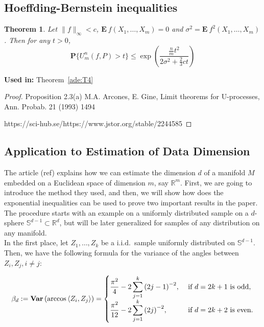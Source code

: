 \documentclass[12pt]{exam}
\def\R{\ensuremath{\mathbb{R}}}
\def\S{\ensuremath{\mathbb{S}}}
\def\E{\ensuremath{\mathbf{E}}\:}
\def\P{\ensuremath{\mathbf{P}}}
\def\Var{\ensuremath{\mathbf{Var}}\,}
\newtheorem{theorem}{Theorem}[section]
\theoremstyle{remark}
\newcommand{\angles}[1]{\ensuremath{\left\langle}#1\ensuremath{\right\rangle} }
\begin{document}
\subsection{Hoeffding-Bernstein inequalities}

\begin{theorem}\label{hb:T1}
  Let $\|f\|_\infty < c$, $\E f(X_1,\ldots, X_m) = 0$ and $\sigma^2 = \E f^2(X_1,\ldots, X_m)$. Then for any $t > 0$,
  \begin{equation}
    \P\{U_m^n(f,P) > t\} \leq \exp \left(\dfrac{\tfrac{n}{m}t^2}{2\sigma^2 + \tfrac{2}{3}ct}\right)
  \end{equation}
\end{theorem}

\textbf{Used in:} Theorem~\ref*{ade:T4}

\begin{proof}
  Proposition 2.3(a) M.A. Arcones, E. Gine, Limit theorems for U-processes, Ann. Probab. 21 (1993) 1494 
  
  https://sci-hub.se/https://www.jstor.org/stable/2244585
\end{proof}


\subsection{Application to Estimation of Data Dimension}
The article (ref) explains how we can estimate the dimension $d$ of a manifold $M$ embedded on a Euclidean space of dimension $m$, say $\R^m$. First, we are going to introduce the method they used, and then, we will show how does the exponential inequalities can be used to prove two important results in the paper. The procedure starts with an example on a uniformly distributed sample on a $d$-sphere $\S^{d-1} \subset \R^d$, but will be later generalized for samples of any distribution on any manifold.\\[4mm]

In the first place, let $Z_1, \ldots, Z_k$ be a i.i.d.\ sample uniformly distributed on $\S^{d-1}$. Then, we have the following formula for the variance of the angles between $Z_i,Z_j, i\neq j$:

\begin{equation}\label{ade:1}\everymath{\displaystyle}
  \beta_d := \Var(\arccos \angles{Z_i,Z_j}) = \begin{cases}
    \frac{\pi^2}{4} - 2 \sum_{j = 1}^{k} {(2j-1)}^{-2}, & \mbox{ if } d = 2k+1 \mbox{ is odd},\\
    \frac{\pi^2}{12}- 2 \sum_{j = 1}^{k} {(2j)}^{-2}, & \mbox{ if } d = 2k+2 \mbox{ is even.}
  \end{cases}
\end{equation}
\end{document}
